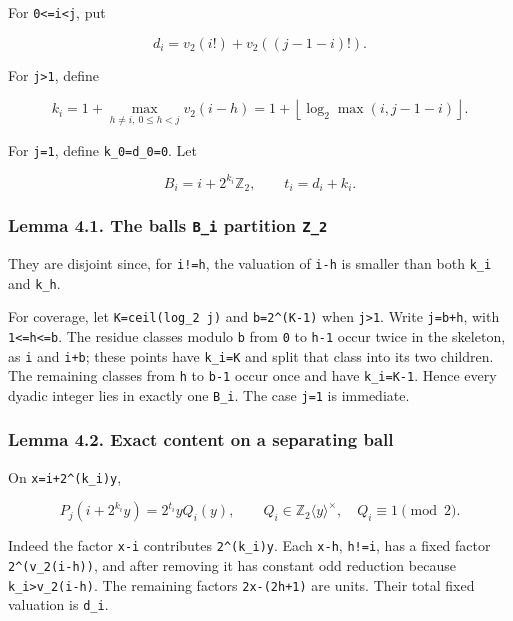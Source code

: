 \documentclass[11pt,letterpaper]{article}
\begin{document}
For \texttt{0\textless{}=i\textless{}j}, put

\[
d_i=v_2(i!)+v_2((j-1-i)!).
\]

For \texttt{j\textgreater{}1}, define

\[
k_i=1+\max_{h\ne i,\ 0\le h<j}v_2(i-h)
=1+\left\lfloor\log_2\max(i,j-1-i)\right\rfloor.
\]

For \texttt{j=1}, define \texttt{k\_0=d\_0=0}. Let

\[
B_i=i+2^{k_i}\mathbb Z_2,\qquad t_i=d_i+k_i. \tag{4.1}
\]

\subsubsection{\texorpdfstring{Lemma 4.1. The balls \texttt{B\_i} partition \texttt{Z\_2}}{Lemma 4.1. The balls B\_i partition Z\_2}}\label{lemma-4.1.-the-balls-b_i-partition-z_2}

They are disjoint since, for \texttt{i!=h}, the valuation of \texttt{i-h} is smaller than both \texttt{k\_i} and \texttt{k\_h}.

For coverage, let \texttt{K=ceil(log\_2\ j)} and \texttt{b=2\^{}(K-1)} when \texttt{j\textgreater{}1}. Write \texttt{j=b+h}, with \texttt{1\textless{}=h\textless{}=b}. The residue classes modulo \texttt{b} from \texttt{0} to \texttt{h-1} occur twice in the skeleton, as \texttt{i} and \texttt{i+b}; these points have \texttt{k\_i=K} and split that class into its two children. The remaining classes from \texttt{h} to \texttt{b-1} occur once and have \texttt{k\_i=K-1}. Hence every dyadic integer lies in exactly one \texttt{B\_i}. The case \texttt{j=1} is immediate.

\subsubsection{Lemma 4.2. Exact content on a separating ball}\label{lemma-4.2.-exact-content-on-a-separating-ball}

On \texttt{x=i+2\^{}(k\_i)y},

\[
P_j(i+2^{k_i}y)=2^{t_i}yQ_i(y),
\qquad Q_i\in\mathbb Z_2\langle y\rangle^\times,
\quad Q_i\equiv1\pmod2. \tag{4.2}
\]

Indeed the factor \texttt{x-i} contributes \texttt{2\^{}(k\_i)y}. Each \texttt{x-h}, \texttt{h!=i}, has a fixed factor \texttt{2\^{}(v\_2(i-h))}, and after removing it has constant odd reduction because \texttt{k\_i\textgreater{}v\_2(i-h)}. The remaining factors \texttt{2x-(2h+1)} are units. Their total fixed valuation is \texttt{d\_i}.
\end{document}
